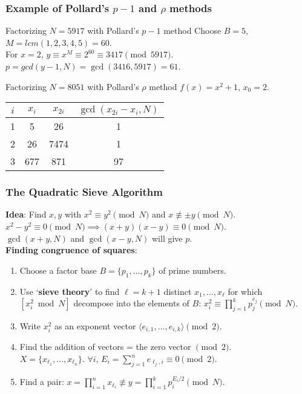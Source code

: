 \begin{frame}\frametitle{Example of Pollard's $p-1$ and $\rho$ methods}
\begin{exampleblock}{Factorizing $N=5917$ with Pollard's $p-1$ method}
Choose $B=5$, $M=lcm(1,2,3,4,5)=60$.\\
For $x=2$, $y \equiv x^M \equiv 2^{60} \equiv 3417 \pmod{5917}$.\\
$p = gcd(y-1,N) = \gcd(3416,5917) = 61$.
\end{exampleblock}
\begin{exampleblock}{Factorizing $N=8051$ with Pollard's $\rho$ method}
$f(x) = x^2+1$, $x_0=2$.\\
\begin{center}
\begin{tabular}{|c|c|c|c|} \hline
$i$  & $x_i$ & $x_{2i}$ & $\gcd(x_{2i}-x_i,N)$ \\ \hline
1 & 5 & 26 & 1 \\
2 & 26 & 7474 & 1 \\
3 & 677 & 871 & 97 \\ \hline
\end{tabular}	
\end{center}
\end{exampleblock}
\end{frame}
\begin{frame}\frametitle{The Quadratic Sieve Algorithm}
\textbf{Idea}: Find $x,y$ with $x^2 \equiv y^2 \pmod N$ and $x \not \equiv \pm y \pmod N$. $x^2-y^2 \equiv 0 \pmod N\implies (x+y)(x-y) \equiv 0 \pmod N$.\\
$\gcd(x+y,N)$ and $\gcd(x-y,N)$ will give $p$.\\
\textbf{Finding congruence of squares}: \\
\begin{enumerate}
\item Choose a factor base $B = \{p_1,\dotsc,p_k\}$ of prime numbers. 
\item Use `\textbf{sieve theory}' to find $\ell = k+1$ distinct $x_1,\dotsc,x_\ell$ for which $[x_i^2 \bmod N]$ decompose into the elements of $B$: $x_i^2 \equiv \prod^k_{j=1} p_j^{e_j} \pmod N$.
\item Write $x_i^2$ as an exponent vector $\langle e_{i,1},\dotsc,e_{i,k}\rangle \pmod 2$.
\item Find the addition of vectors = the zero vector $\pmod 2$.\\
$X=\{x_{\ell_1},\dotsc,x_{\ell_n}\}$. $\forall i$, $E_i = \sum_{j=1}^ne_{\ell_j,i} \equiv 0 \pmod 2$.
\item Find a pair: $x = \prod_{i=1}^nx_{\ell_i} \not \equiv y=\prod_{i=1}^kp_i^{E_i/2} \pmod N$.  
\end{enumerate}
\end{frame}
